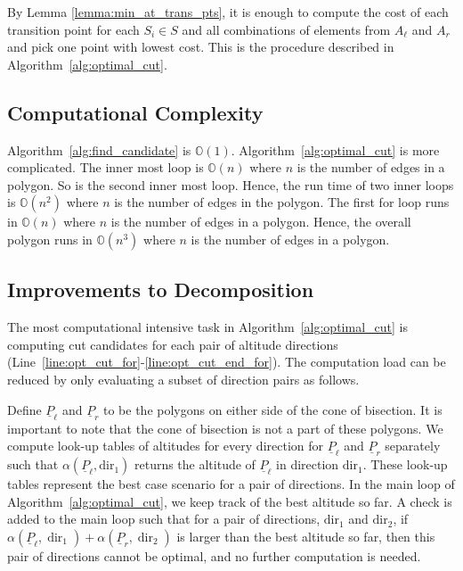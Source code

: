 \documentclass[../main.tex]{subfiles}
\begin{document}
By Lemma \ref{lemma:min_at_trans_pts}, it is enough to compute the cost of each transition point for each $S_i\in S$ and all combinations of elements from $A_{\ell}$ and $A_r$ and pick one point with lowest cost. This is the procedure described in Algorithm~\ref{alg:optimal_cut}.

\subsection{Computational Complexity}
Algorithm~\ref{alg:find_candidate} is $\mathbb{O}(1)$. Algorithm~\ref{alg:optimal_cut} is more complicated. The inner most loop is $\mathbb{O}(n)$ where $n$ is the number of edges in a polygon. So is the second inner most loop. Hence, the run time of two inner loops is $\mathbb{O}(n^2)$ where $n$ is the number of edges in the polygon. The first for loop runs in $\mathbb{O}(n)$ where $n$ is the number of edges in a polygon. Hence, the overall polygon runs in $\mathbb{O}(n^3)$ where $n$ is the number of edges in a polygon.

\subsection{Improvements to Decomposition}
\label{sec:improvment}
The most computational intensive task in Algorithm~\ref{alg:optimal_cut}  is computing cut candidates for each pair of altitude directions (Line~\ref{line:opt_cut_for}-\ref{line:opt_cut_end_for}). The computation load can be reduced by only evaluating a subset of direction pairs as follows.

Define $\underline{P}_{\ell}$ and $\underline{P}_{r}$ to be the polygons on either side of the cone of bisection. It is important to note that the cone of bisection is not a part of these polygons. We compute look-up tables of altitudes for every direction for $\underline{P}_{\ell}$ and $\underline{P}_{r}$ separately such that $\alpha(\underline{P}_{\ell},\text{dir}_1)$ returns the altitude of $\underline{P}_{\ell}$ in direction $\text{dir}_1$. These look-up tables represent the best case scenario for a pair of directions. In the main loop of Algorithm~\ref{alg:optimal_cut}, we keep track of the best altitude so far. A check is added to the main loop such that for a pair of directions, $\text{dir}_1$ and $\text{dir}_2$, if $\alpha(\underline{P}_{\ell},\operatorname{dir}_1)+\alpha(\underline{P}_{r},\operatorname{dir}_2)$ is larger than the best altitude so far, then this pair of directions cannot be optimal, and no further computation is needed.
\end{document}
